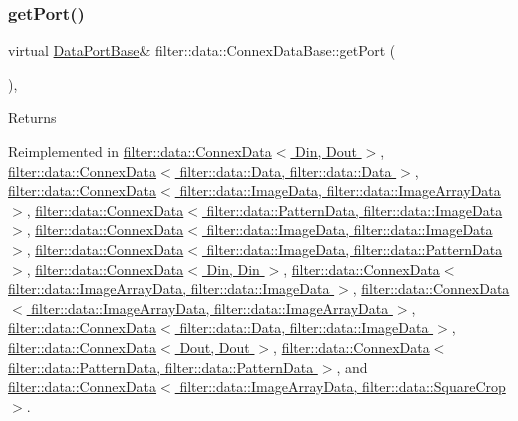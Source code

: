 \subsubsection{\texorpdfstring{get\+Port()}{getPort()}}
{\footnotesize\ttfamily virtual \hyperlink{classfilter_1_1data_1_1_data_port_base}{Data\+Port\+Base}\& filter\+::data\+::\+Connex\+Data\+Base\+::get\+Port (\begin{DoxyParamCaption}{ }\end{DoxyParamCaption})\hspace{0.3cm}{\ttfamily [inline]}, {\ttfamily [virtual]}}

\begin{DoxyReturn}{Returns}

\end{DoxyReturn}


Reimplemented in \hyperlink{classfilter_1_1data_1_1_connex_data_aecd47354b992800c9d9e69ad951382fb}{filter\+::data\+::\+Connex\+Data$<$ Din, Dout $>$}, \hyperlink{classfilter_1_1data_1_1_connex_data_aecd47354b992800c9d9e69ad951382fb}{filter\+::data\+::\+Connex\+Data$<$ filter\+::data\+::\+Data, filter\+::data\+::\+Data $>$}, \hyperlink{classfilter_1_1data_1_1_connex_data_aecd47354b992800c9d9e69ad951382fb}{filter\+::data\+::\+Connex\+Data$<$ filter\+::data\+::\+Image\+Data, filter\+::data\+::\+Image\+Array\+Data $>$}, \hyperlink{classfilter_1_1data_1_1_connex_data_aecd47354b992800c9d9e69ad951382fb}{filter\+::data\+::\+Connex\+Data$<$ filter\+::data\+::\+Pattern\+Data, filter\+::data\+::\+Image\+Data $>$}, \hyperlink{classfilter_1_1data_1_1_connex_data_aecd47354b992800c9d9e69ad951382fb}{filter\+::data\+::\+Connex\+Data$<$ filter\+::data\+::\+Image\+Data, filter\+::data\+::\+Image\+Data $>$}, \hyperlink{classfilter_1_1data_1_1_connex_data_aecd47354b992800c9d9e69ad951382fb}{filter\+::data\+::\+Connex\+Data$<$ filter\+::data\+::\+Image\+Data, filter\+::data\+::\+Pattern\+Data $>$}, \hyperlink{classfilter_1_1data_1_1_connex_data_aecd47354b992800c9d9e69ad951382fb}{filter\+::data\+::\+Connex\+Data$<$ Din, Din $>$}, \hyperlink{classfilter_1_1data_1_1_connex_data_aecd47354b992800c9d9e69ad951382fb}{filter\+::data\+::\+Connex\+Data$<$ filter\+::data\+::\+Image\+Array\+Data, filter\+::data\+::\+Image\+Data $>$}, \hyperlink{classfilter_1_1data_1_1_connex_data_aecd47354b992800c9d9e69ad951382fb}{filter\+::data\+::\+Connex\+Data$<$ filter\+::data\+::\+Image\+Array\+Data, filter\+::data\+::\+Image\+Array\+Data $>$}, \hyperlink{classfilter_1_1data_1_1_connex_data_aecd47354b992800c9d9e69ad951382fb}{filter\+::data\+::\+Connex\+Data$<$ filter\+::data\+::\+Data, filter\+::data\+::\+Image\+Data $>$}, \hyperlink{classfilter_1_1data_1_1_connex_data_aecd47354b992800c9d9e69ad951382fb}{filter\+::data\+::\+Connex\+Data$<$ Dout, Dout $>$}, \hyperlink{classfilter_1_1data_1_1_connex_data_aecd47354b992800c9d9e69ad951382fb}{filter\+::data\+::\+Connex\+Data$<$ filter\+::data\+::\+Pattern\+Data, filter\+::data\+::\+Pattern\+Data $>$}, and \hyperlink{classfilter_1_1data_1_1_connex_data_aecd47354b992800c9d9e69ad951382fb}{filter\+::data\+::\+Connex\+Data$<$ filter\+::data\+::\+Image\+Array\+Data, filter\+::data\+::\+Square\+Crop $>$}.

